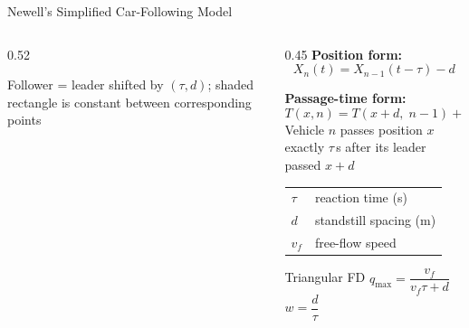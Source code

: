\documentclass[11pt,aspectratio=169]{beamer}
\begin{document}
\begin{frame}[shrink=15]{Newell's Simplified Car-Following Model}
\begin{columns}[T]
\begin{column}{0.52\textwidth}
\begin{center}
\end{center}
{\scriptsize Follower = leader shifted by $(\tau, d)$; shaded rectangle is constant between corresponding points}
\end{column}
\begin{column}{0.45\textwidth}
\vspace{0.5em}
\textbf{Position form:}
\[
X_{n}(t) = X_{n-1}(t - \tau) - d
\]

\vspace{0.3em}
\textbf{Passage-time form:}
\[
\boxed{T(x, n) = T(x + d,\; n{-}1) + \tau}
\]
{\scriptsize Vehicle $n$ passes position $x$ exactly $\tau$\,s after its leader passed $x{+}d$}

\vspace{0.8em}
{\small
\begin{tabular}{@{}ll@{}}
$\tau$ & reaction time (s) \\
$d$ & standstill spacing (m) \\
$v_f$ & free-flow speed \\
\end{tabular}
}

\vspace{0.8em}
\begin{block}{Triangular FD}
$q_{\max} = \dfrac{v_f}{v_f \tau + d}$
\qquad $w = \dfrac{d}{\tau}$
\end{block}
\end{column}
\end{columns}
\end{frame}
\end{document}

